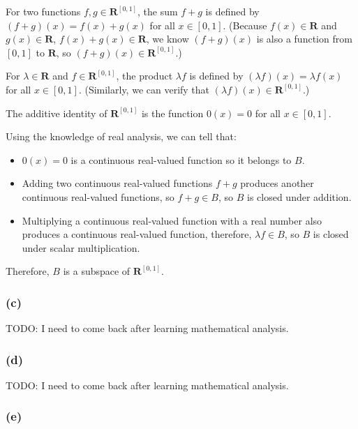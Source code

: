 \documentclass[12pt, letterpaper, oneside]{book}
\begin{document}
For two functions $f, g \in \mathbf{R}^{[0,1]}$, the sum $f + g$ is defined by
$(f + g)(x) = f(x) + g(x)$ for all $x \in [0,1]$. (Because $f(x) \in
  \mathbf{R}$ and $g(x) \in \mathbf{R}$, $f(x) + g(x) \in \mathbf{R}$, we know
$(f + g)(x)$ is also a function from $[0,1]$ to $\mathbf{R}$, so $(f + g)(x)
  \in \mathbf{R}^{[0,1]}$.)

For $\lambda \in \mathbf{R}$ and $f \in \mathbf{R}^{[0,1]}$, the product
$\lambda f$ is defined by $(\lambda f)(x) = \lambda f(x)$ for all $x \in [0,1]$.
(Similarly, we can verify that $(\lambda f)(x) \in \mathbf{R}^{[0,1]}$.)

The additive identity of $\mathbf{R}^{[0,1]}$ is the function $0(x) = 0$ for
all $x \in [0,1]$.

Using the knowledge of real analysis, we can tell that:
\begin{itemize}
  \item $0(x) = 0$ is a continuous real-valued function so it belongs to $B$.
  \item Adding two continuous real-valued functions $f + g$ produces another
        continuous real-valued functions, so $f + g \in B$, so $B$ is closed under
        addition.
  \item Multiplying a continuous real-valued function with a real number also
        produces a continuous real-valued function, therefore, $\lambda f \in B$,
        so $B$ is closed under scalar multiplication.
\end{itemize}

Therefore, $B$ is a subspace of $\mathbf{R}^{[0,1]}$.

\subsubsection*{(c)}

TODO: I need to come back after learning mathematical analysis.

\subsubsection*{(d)}

TODO: I need to come back after learning mathematical analysis.

\subsubsection*{(e)}
\end{document}
